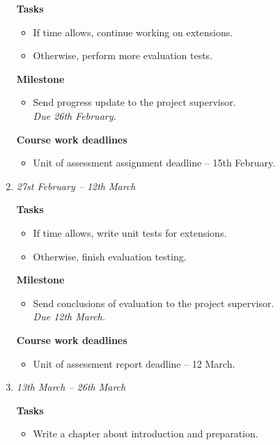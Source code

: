 \documentclass[a4paper,12pt]{article}
\begin{document}
\begin{enumerate}
\textbf{Tasks}
 \begin{itemize}
 \item If time allows, continue working on extensions.
 \item Otherwise, perform more evaluation tests.
 \end{itemize}

\textbf{Milestone}
 \begin{itemize}
  \item Send progress update to the project supervisor.\\
 \emph{ Due 26th February. }
 \end{itemize}

 \textbf{Course work deadlines}
 \begin{itemize}
  \item Unit of assessment assignment deadline -- 15th February.
 \end{itemize} 



 
 \item 
 \emph{27st February -- 12th March}

\textbf{Tasks}
 \begin{itemize}
 \item If time allows, write unit tests for extensions.
 \item Otherwise, finish evaluation testing.
 \end{itemize}

\textbf{Milestone}
 \begin{itemize}
  \item Send conclusions of evaluation to the project supervisor.\\
 \emph{ Due 12th March. }
 \end{itemize}

 \textbf{Course work deadlines}
 \begin{itemize}
  \item 
  Unit of assessment report deadline -- 12 March.
 \end{itemize} 
 




 \item 
 \emph{13th March -- 26th March}

 \textbf{Tasks}
 \begin{itemize}
  \item 
  Write a chapter about introduction and preparation.
 \end{itemize}


\end{enumerate}
\end{document}
